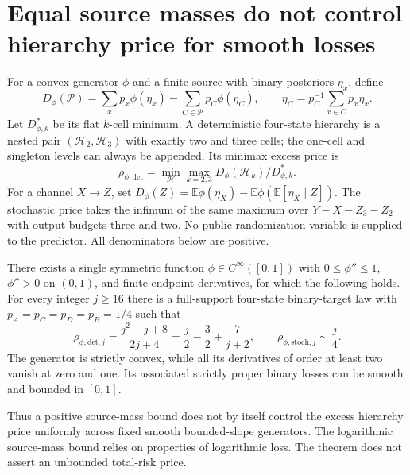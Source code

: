 \section{Equal source masses do not control hierarchy price for smooth losses}
\label{sec:equal-mass-generator}

For a convex generator $\phi$ and a finite source with binary posteriors
$\eta_x$, define
\[
 D_\phi(\mathcal P)=\sum_xp_x\phi(\eta_x)
  -\sum_{C\in\mathcal P}p_C\phi(\bar\eta_C),\qquad
 \bar\eta_C=p_C^{-1}\sum_{x\in C}p_x\eta_x.
\]
Let $D_{\phi,k}^*$ be its flat $k$-cell minimum.  A deterministic
four-state hierarchy is a nested pair $(\mathcal H_2,\mathcal H_3)$
with exactly two and three cells; the one-cell and singleton levels can
always be appended.  Its minimax excess price is
\[
 \rho_{\phi,\mathrm{det}}
 =\min_{\mathcal H}\max_{k=2,3}
     D_\phi(\mathcal H_k)/D_{\phi,k}^*.
\]
For a channel $X\to Z$, set
$D_\phi(Z)=\mathbb E\phi(\eta_X)
 -\mathbb E\phi(\mathbb E[\eta_X\mid Z])$.
The stochastic price takes the infimum of the same maximum over
$Y-X-Z_3-Z_2$ with output budgets three and two.  No public randomization
variable is supplied to the predictor.  All denominators below are positive.

\begin{theorem}
\label{thm:equal-mass-smooth}
There exists a single symmetric function $\phi\in C^\infty([0,1])$
with $0\leq\phi''\leq1$, $\phi''>0$ on $(0,1)$, and finite endpoint
derivatives, for which the following holds.  For every integer $j\geq16$
there is a full-support four-state binary-target law with
$p_A=p_C=p_D=p_B=1/4$ such that
\[
 \rho_{\phi,\mathrm{det},j}
   =\frac{j^2-j+8}{2j+4}
   =\frac j2-\frac32+\frac7{j+2},\qquad
 \rho_{\phi,\mathrm{stoch},j}\sim\frac j4.
 \tag{8}\label{eq:equal-mass-prices}
\]
The generator is strictly convex, while all its derivatives of order at
least two vanish at zero and one.  Its associated strictly proper binary
losses can be smooth and bounded in $[0,1]$.
\end{theorem}

Thus a positive source-mass bound does not by itself control the excess
hierarchy price uniformly across fixed smooth bounded-slope generators.
The logarithmic source-mass bound relies on properties of logarithmic
loss.  The theorem does not assert an unbounded total-risk price.

